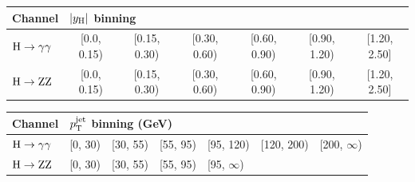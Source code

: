 \begin{table}[htb]
    \centering
    \label{tab:binningabsy}
    \begin{tabular}{lcccccc}
    Channel & \multicolumn{6}{l}{$\left|y_\mathrm{H}\right| $ binning} \\[\tablelineskip]
    \hline
    $\mathrm{H}\to\mathrm{\gamma}\mathrm{\gamma}$ & [0.0, 0.15) & [0.15, 0.30) & [0.30, 0.60) & [0.60, 0.90) & [0.90, 1.20) & [1.20, 2.50] \\
    $\mathrm{H}\to\mathrm{Z}\mathrm{Z}$ & [0.0, 0.15) & [0.15, 0.30) & [0.30, 0.60) & [0.60, 0.90) & [0.90, 1.20) & [1.20, 2.50] \\
    \end{tabular}
    \end{table}

\begin{table}[h!]
    \centering
    \label{tab:binningptjet}
    \begin{tabular}{lcccccc}
    Channel & \multicolumn{6}{l}{$p_\mathrm{T}^\text{jet} $ binning (GeV)} \\[\tablelineskip]
    \hline
    $\mathrm{H}\to\mathrm{\gamma}\mathrm{\gamma}$ & [0, 30) & [30, 55) & [55, 95) & [95, 120) & [120, 200) & [200, $\infty$) \\
    $\mathrm{H}\to\mathrm{Z}\mathrm{Z}$ & [0, 30) & [30, 55) & [55, 95) & \multicolumn{3}{l}{ [95, $\infty$) } \\
    \end{tabular}
    \end{table}














